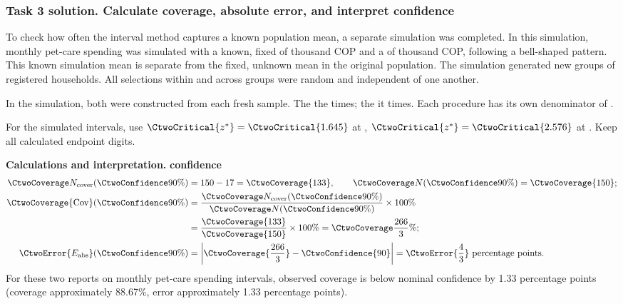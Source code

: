 \subsubsection*{Task 3 solution. Calculate coverage, absolute error, and interpret confidence}
\label{sol:c2-2-c}
To check how often the interval method captures a known population mean, a separate simulation was completed. In this simulation, monthly pet-care spending was simulated with a known, fixed  of  thousand COP and a  of  thousand COP, following a bell-shaped pattern. This known simulation mean is separate from the fixed, unknown mean in the original population. The simulation generated  new groups of  registered households. All selections within and across groups were random and independent of one another.

In the simulation, both  were constructed from each fresh sample.
The    the   times; the    it  times. Each procedure has its own denominator of .

For the simulated intervals, use $\CtwoCritical{z^*}=\CtwoCritical{1.645}$ at , $\CtwoCritical{z^*}=\CtwoCritical{2.576}$ at . Keep all calculated endpoint digits.

\textbf{Calculations and interpretation.}
\textbf{ confidence}\nopagebreak[4]
\begin{align*}
\CtwoCoverCount(\CtwoConfidence{90\%})&=150-17=\CtwoCoverage{133},
\qquad\CtwoTotalCount(\CtwoConfidence{90\%})=\CtwoCoverage{150};\\
\CtwoCoverage{\mathrm{Cov}}(\CtwoConfidence{90\%})
&=\frac{\CtwoCoverCount(\CtwoConfidence{90\%})}{\CtwoTotalCount(\CtwoConfidence{90\%})}\times100\%
\\
&=\frac{\CtwoCoverage{133}}{\CtwoCoverage{150}}\times100\%=\CtwoCoverage{\frac{266}{3}\%};\\
\CtwoError{E_{\rm abs}}(\CtwoConfidence{90\%})
&=\left|\CtwoCoverage{\frac{266}{3}}-\CtwoConfidence{90}\right|=\CtwoError{\frac{4}{3}}\ \text{percentage points}.
\end{align*}
For these two reports on monthly pet-care spending intervals, observed coverage is below nominal confidence by 1.33 percentage points (coverage approximately 88.67\%, error approximately 1.33 percentage points).

